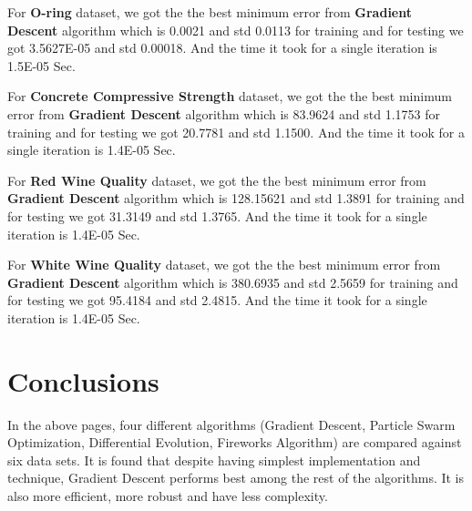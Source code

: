 \documentclass[11pt, a4paper]{report}
\begin{document}
For \textbf{O-ring} dataset, we got the the best minimum error from \textbf{Gradient Descent} algorithm which is 0.0021 and std 0.0113 for training and for testing we got 3.5627E-05 and std 0.00018. And the time it took for a single iteration is 1.5E-05 Sec.

For \textbf{Concrete Compressive Strength} dataset, we got the the best minimum error from \textbf{Gradient Descent} algorithm which is 83.9624 and std 1.1753 for training and for testing we got 20.7781 and std 1.1500. And the time it took for a single iteration is 1.4E-05 Sec.

For \textbf{Red Wine Quality} dataset, we got the the best minimum error from \textbf{Gradient Descent} algorithm which is 128.15621 and std 1.3891 for training and for testing we got 31.3149 and std 1.3765. And the time it took for a single iteration is 1.4E-05 Sec.

For \textbf{White Wine Quality} dataset, we got the the best minimum error from \textbf{Gradient Descent} algorithm which is 380.6935 and std 2.5659 for training and for testing we got 95.4184 and std 2.4815. And the time it took for a single iteration is 1.4E-05 Sec.

\newpage

\chapter{Conclusions}
In the above pages, four different algorithms (Gradient Descent, Particle Swarm Optimization, Differential Evolution, Fireworks Algorithm) are compared against six data sets. It is found that despite having simplest implementation and technique, Gradient Descent performs best among the rest of the algorithms. It is also more efficient, more robust and have less complexity.
\end{document}
